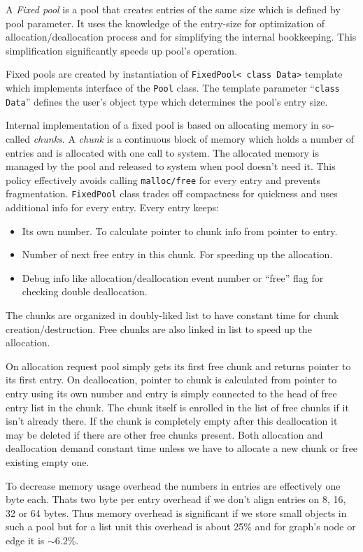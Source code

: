 \documentclass[11pt,a4paper]{article}
\begin{document}
A \emph{Fixed pool} is a pool that creates entries of the same size which is defined by pool parameter. It uses the knowledge of the entry-size for optimization of allocation/deallocation process and for simplifying the internal bookkeeping. This simplification significantly speeds up pool's operation.

Fixed pools are created by instantiation of \lstinline{FixedPool< class Data>} template which implements interface of the \lstinline{Pool} class. The template parameter ``\lstinline{class Data}'' defines the user's object type which determines the pool's entry size.

Internal implementation of a fixed pool is based on allocating memory in so-called \emph{chunks}. A \emph{chunk} is a continuous block of memory which holds a number of entries and is allocated with one call to system. The allocated memory is managed by the pool and released to system when pool doesn't need it. This policy effectively avoids calling \lstinline{malloc/free} for every entry and prevents fragmentation. \lstinline{FixedPool} class trades off compactness for quickness and uses additional info for every entry. Every entry keeps:
\begin{itemize}
\item Its own number. To calculate pointer to chunk info from pointer to entry.
\item Number of next free entry in this chunk. For speeding up the allocation.
\item Debug info like allocation/deallocation event number or ``free'' flag for checking double deallocation.
\end{itemize}
The chunks are organized in doubly-liked list to have constant time for chunk creation/destruction. Free chunks are also linked in list to speed up the allocation. 

On allocation request pool simply gets its first free chunk and returns pointer to its first entry. On deallocation, pointer to chunk is calculated from pointer to entry using its own number and entry is simply connected to the head of free entry list in the chunk. The chunk itself is enrolled in the list of free chunks if it isn't already there. If the chunk is completely empty after this deallocation it may be deleted if there are other free chunks present. Both allocation and deallocation demand constant time unless we have to allocate a new chunk or free existing empty one.

To decrease memory usage overhead the numbers in entries are effectively one byte each. Thats two byte per entry overhead if we don't align entries on 8, 16, 32 or 64 bytes. Thus memory overhead is significant if we store small objects in such a pool but for a list unit this overhead is about 25\% and for graph's node or edge it is $\sim$6.2\%.
\end{document}
